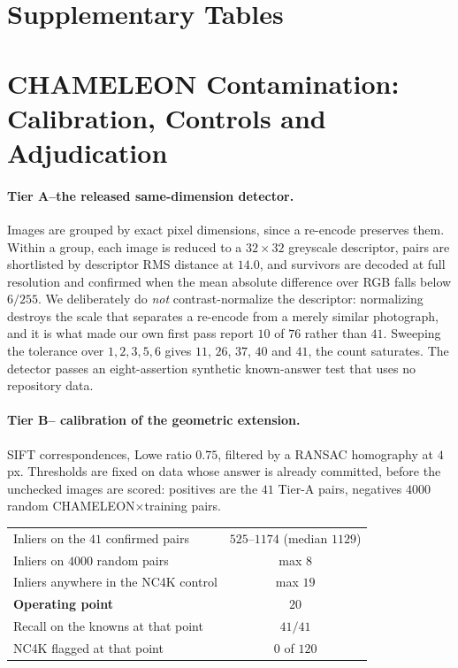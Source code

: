\documentclass{article}
\begin{document}
\section{Supplementary Tables}
\label{app:tables}





\clearpage


\section{CHAMELEON Contamination: Calibration, Controls and Adjudication}
\label{app:chamext}

\paragraph{Tier A--the released same-dimension detector.} Images are grouped by exact pixel
dimensions, since a re-encode preserves them. Within a group, each image is reduced to a
$32\times32$ greyscale descriptor, pairs are shortlisted by descriptor RMS distance at $14.0$, and
survivors are decoded at full resolution and confirmed when the mean absolute difference over RGB
falls below $6/255$. We deliberately do \emph{not} contrast-normalize the descriptor: normalizing
destroys the scale that separates a re-encode from a merely similar photograph, and it is what made
our own first pass report $10$ of $76$ rather than $41$. Sweeping the tolerance over
$1, 2, 3, 5, 6$ gives $11$, $26$, $37$, $40$ and $41$, the count saturates. The detector passes an
eight-assertion synthetic known-answer test that uses no repository data.

\paragraph{Tier B-- calibration of the geometric extension.} SIFT correspondences, Lowe ratio
$0.75$, filtered by a RANSAC homography at $4$ px. Thresholds are fixed on data whose answer is
already committed, before the unchecked images are scored: positives are the $41$ Tier-A pairs,
negatives $4000$ random CHAMELEON$\times$training pairs.

\begin{center}\small
\begin{tabular}{lc}
\toprule
Inliers on the $41$ confirmed pairs & $525$--$1174$ (median $1129$) \\
Inliers on $4000$ random pairs & max $8$ \\
Inliers anywhere in the NC4K control & max $19$ \\
\textbf{Operating point} & \textbf{$20$} \\
Recall on the knowns at that point & $41/41$ \\
NC4K flagged at that point & $0$ of $120$ \\
\bottomrule
\end{tabular}
\end{center}
\end{document}
